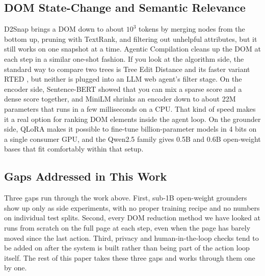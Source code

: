 \subsection{DOM State-Change and Semantic Relevance}
D2Snap \cite{schiepanski2025d2snap} brings a DOM down to about $10^3$ tokens by merging nodes from the bottom up, pruning with TextRank, and filtering out unhelpful attributes, but it still works on one snapshot at a time. Agentic Compilation \cite{agenticcompilation2025} cleans up the DOM at each step in a similar one-shot fashion. If you look at the algorithm side, the standard way to compare two trees is Tree Edit Distance \cite{zhangshasha1989ted} and its faster variant RTED \cite{pawlik2011rted}, but neither is plugged into an LLM web agent's filter stage. On the encoder side, Sentence-BERT \cite{reimers2019sbert} showed that you can mix a sparse score and a dense score together, and MiniLM \cite{wang2020minilm} shrinks an encoder down to about 22M parameters that runs in a few milliseconds on a CPU. That kind of speed makes it a real option for ranking DOM elements inside the agent loop. On the grounder side, QLoRA \cite{dettmers2023qlora} makes it possible to fine-tune billion-parameter models in 4 bits on a single consumer GPU, and the Qwen2.5 \cite{qwen25techreport2024} family gives 0.5B and 0.6B open-weight bases that fit comfortably within that setup.

\subsection{Gaps Addressed in This Work}
Three gaps run through the work above. First, sub-1B open-weight grounders show up only as side experiments, with no proper training recipe and no numbers on individual test splits. Second, every DOM reduction method we have looked at runs from scratch on the full page at each step, even when the page has barely moved since the last action. Third, privacy and human-in-the-loop checks tend to be added on after the system is built rather than being part of the action loop itself. The rest of this paper takes these three gaps and works through them one by one.
